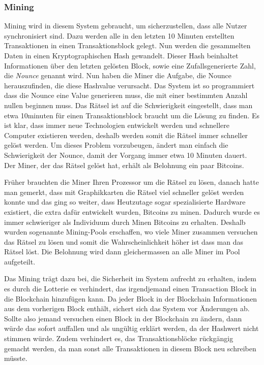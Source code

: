 \subsubsection*{Mining}

\noindent
Mining wird in diesem System gebraucht, um sicherzustellen, dass alle Nutzer synchronisiert sind. Dazu werden alle in den letzten 10 Minuten erstellten Transaktionen in einen Transaktionsblock gelegt.
Nun werden die gesammelten Daten in einen Kryptographischen Hash gewandelt. Dieser Hash beinhaltet Informationen über den letzten gelösten Block, sowie eine Zufallsgenerierte Zahl, die
\emph{\dq Nounce \dq} genannt wird. Nun haben die Miner die Aufgabe, die Nounce herauszufinden, die diese Hashvalue verursacht. Das System ist so programmiert dass die Nounce eine Value
generieren muss, die mit einer bestimmten Anzahl nullen beginnen muss. Das Rätsel ist auf die Schwierigkeit eingestellt, dass man etwa 10minuten für einen Transaktionsblock braucht um die Lösung
zu finden. Es ist klar, dass immer neue Technologien entwickelt werden und schnellere Computer existieren werden, deshalb werden somit die Rätsel immer schneller gelöst werden. Um dieses Problem vorzubeugen,
ändert man einfach die Schwierigkeit der Nounce, damit der Vorgang immer etwa 10 Minuten dauert. Der Miner, der das Rätsel gelöst hat, erhält als Belohnung ein paar Bitcoins.

\noindent
Früher brauchten die Miner Ihren Prozessor um die Rätsel zu lösen, danach hatte man gemerkt, dass mit Graphikkarten die Rätsel viel schneller gelöst werden konnte und das ging so weiter, dass
Heutzutage sogar spezialisierte Hardware existiert, die extra dafür entwickelt wurden, Bitcoins zu minen. Dadurch wurde es immer schwieriger als Individuum durch Minen Bitcoins zu erhalten.
Deshalb wurden sogenannte Mining-Pools erschaffen, wo viele Miner zusammen versuchen das Rätsel zu lösen und somit die Wahrscheinlichkeit höher ist dass man das Rätsel löst. Die Belohnung wird dann
gleichermassen an alle Miner im Pool aufgeteilt.

\noindent
Das Mining trägt dazu bei, die Sicherheit im System aufrecht zu erhalten, indem es durch die Lotterie es verhindert, das irgendjemand einen Transaction Block in die Blockchain hinzufügen kann.
Da jeder Block in der Blockchain Informationen aus dem vorherigen Block enthält, sichert sich das System vor Änderungen ab. Sollte also jemand versuchen einen Block in der Blockchain
zu ändern, dann würde das sofort auffallen und als ungültig erklärt werden, da der Hashwert nicht stimmen würde. Zudem verhindert es, das Transaktionsblöcke rückgängig gemacht werden, da man
sonst alle Transaktionen in diesem Block neu schreiben müsste.

